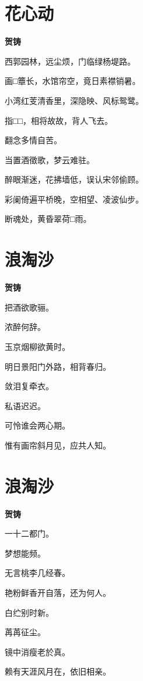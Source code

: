 \documentclass[12pt,a4paper]{ctexbook}
\begin{document}
\section{花心动}
\textbf{贺铸}\par\vspace{0.5em}
西郭园林，远尘烦，门临绿杨堤路。\par
画□簟长，水馆帘空，竟日素襟销暑。\par
小湾红芰清香里，深隐映、风标鸳鹭。\par
指□□，相将故故，背人飞去。\par
翻念多情自苦。\par
当置酒徵歌，梦云难驻。\par
醉眼渐迷，花拂墙低，误认宋邻偷顾。\par
彩阑倚遍平桥晚，空相望、凌波仙步。\par
断魂处，黄昏翠荷□雨。\par

\section{浪淘沙}
\textbf{贺铸}\par\vspace{0.5em}
把酒欲歌骊。\par
浓醉何辞。\par
玉京烟柳欲黄时。\par
明日景阳门外路，相背春归。\par
敛泪复牵衣。\par
私语迟迟。\par
可怜谁会两心期。\par
惟有画帘斜月见，应共人知。\par

\section{浪淘沙}
\textbf{贺铸}\par\vspace{0.5em}
一十二都门。\par
梦想能频。\par
无言桃李几经春。\par
艳粉鲜香开自落，还为何人。\par
白纻别时新。\par
苒苒征尘。\par
镜中消瘦老於真。\par
赖有天涯风月在，依旧相亲。\par
\end{document}
